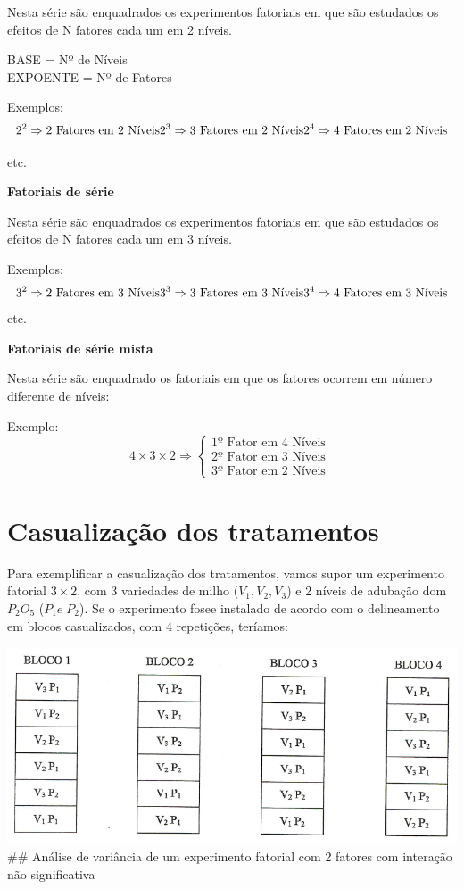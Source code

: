 \documentclass[
]{book}
\begin{document}
Nesta série são enquadrados os experimentos fatoriais em que são estudados os efeitos de N fatores cada um em 2 níveis.

BASE = Nº de Níveis\\
EXPOENTE = Nº de Fatores

Exemplos:
\[
2^2 \Rightarrow \text{2 Fatores em 2 Níveis} \\
2^3 \Rightarrow \text{3 Fatores em 2 Níveis} \\
2^4 \Rightarrow \text{4 Fatores em 2 Níveis} \\
\]

etc.

\textbf{Fatoriais de série}

Nesta série são enquadrados os experimentos fatoriais em que são estudados os efeitos de N fatores cada um em 3 níveis.

Exemplos:
\[
3^2 \Rightarrow \text{2 Fatores em 3 Níveis} \\
3^3 \Rightarrow \text{3 Fatores em 3 Níveis} \\
3^4 \Rightarrow \text{4 Fatores em 3 Níveis} \\
\]
etc.

\textbf{Fatoriais de série mista}

Nesta série são enquadrado os fatoriais em que os fatores ocorrem em número diferente de níveis:

Exemplo:
\[
4\times 3\times 2 \Rightarrow \begin{cases} \text{1º Fator em 4 Níveis }\\ \text{2º Fator em 3 Níveis } \\ \text{3º Fator em 2 Níveis } \end{cases}
\]

\hypertarget{casualizauxe7uxe3o-dos-tratamentos}{%
\section{Casualização dos tratamentos}\label{casualizauxe7uxe3o-dos-tratamentos}}

Para exemplificar a casualização dos tratamentos, vamos supor um experimento fatorial \(3 \times 2\), com 3 variedades de milho (\(V_1,V_2,V_3\)) e 2 níveis de adubação dom \(P_2O_5\) (\(P_1 e\; P_2\)). Se o experimento fosee instalado de acordo com o delineamento em blocos casualizados, com 4 repetições, teríamos:

\includegraphics{Casuali.png}
\#\# Análise de variância de um experimento fatorial com 2 fatores com interação não significativa
\end{document}
